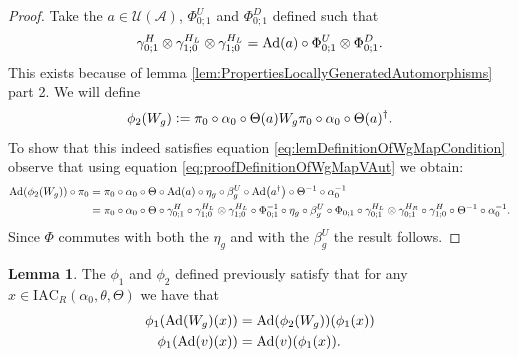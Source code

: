 \documentclass[12pt,a4paper,twoside]{article}
\newcommand{\defeq}{\vcentcolon=}
\let\originalleft\left
\let\originalright\right
\renewcommand{\left}{\mathopen{}\mathclose\bgroup\originalleft}
\renewcommand{\right}{\aftergroup\egroup\originalright}
\newcommand{\UU}{\mathcal U}
\renewcommand{\AA}{\mathcal A}
\newcommand{\Ad}[1]{\textrm{Ad}\left(#1\right)}
\theoremstyle{definition}
\newtheorem{lemma}[theorem]{Lemma}
\numberwithin{equation}{section}
\begin{document}
\begin{proof}
	Take the $a\in\UU(\AA)$, $\Phi^U_{0;1}$ and $\Phi^D_{0;1}$ defined such that
	\begin{equation}\label{eq:proofDefinitionOfWgMapVAut}
		\gamma^H_{0;1}\otimes\gamma^{H_L}_{1;0}\otimes\gamma^{H_L}_{1;0}=\Ad{a}\circ\Phi^U_{0;1}\otimes\Phi^D_{0;1}.
	\end{equation}
	This exists because of lemma \ref{lem:PropertiesLocallyGeneratedAutomorphisms} part 2. We will define
	\begin{equation}
		\phi_2(W_g)\defeq \pi_0\circ\alpha_0\circ\Theta(a)W_g\pi_0\circ\alpha_0\circ\Theta(a)^\dagger.
	\end{equation}
	To show that this indeed satisfies equation \eqref{eq:lemDefinitionOfWgMapCondition} observe that using equation \eqref{eq:proofDefinitionOfWgMapVAut} we obtain:
	\begin{align}
		\Ad{\phi_2(W_g)}\circ\pi_0&=\pi_0\circ \alpha_0\circ\Theta\circ\Ad{a}\circ\eta_g\circ\beta_g^U\circ\Ad{a^{\dagger}}\circ\Theta^{-1}\circ\alpha_0^{-1}\\
		&=\pi_0\circ \alpha_0\circ\Theta\circ\gamma^H_{0;1}\circ\gamma^{H_L}_{1;0}\otimes\gamma^{H_L}_{1;0}\circ\Phi_{0;1}^{-1}\circ\eta_g\circ\beta_g^U\circ\Phi_{0;1}\circ\gamma^{H_L}_{0;1}\otimes\gamma^{H_R}_{0;1}\circ\gamma^H_{1;0}\circ\Theta^{-1}\circ\alpha_0^{-1}.
	\end{align}
	Since $\Phi$ commutes with both the $\eta_g$ and with the $\beta_g^U$ the result follows.
\end{proof}
\begin{lemma}\label{lem:phi1phi2matchingCondition}
	The $\phi_1$ and $\phi_2$ defined previously satisfy that for any $x\in\textrm{IAC}_R(\alpha_0,\theta,\Theta)$ we have that
	\begin{align}
		\phi_1(\Ad{W_g}(x))&=\Ad{\phi_2(W_g)}(\phi_1(x))\\
		\phi_1(\Ad{v}(x))&=\Ad{v}(\phi_1(x)).
	\end{align}
\end{lemma}
\end{document}
